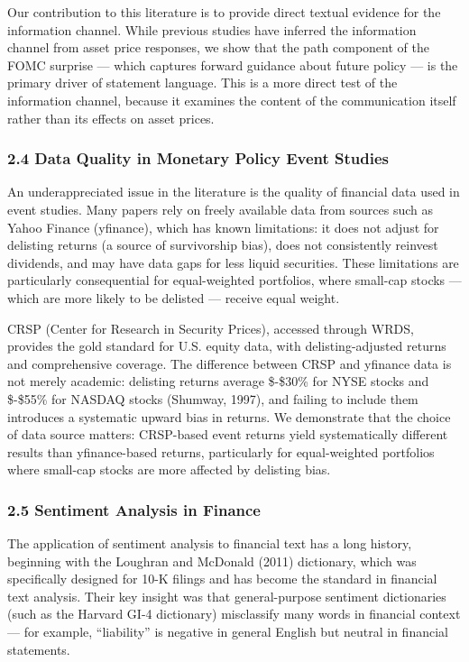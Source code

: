 \documentclass[12pt]{article}
\begin{document}
Our contribution to this literature is to provide direct textual
evidence for the information channel. While previous studies have
inferred the information channel from asset price responses, we show
that the path component of the FOMC surprise --- which captures forward
guidance about future policy --- is the primary driver of statement
language. This is a more direct test of the information channel, because
it examines the content of the communication itself rather than its
effects on asset prices.

\subsubsection{2.4 Data Quality in Monetary Policy Event
Studies}\label{data-quality-in-monetary-policy-event-studies}

An underappreciated issue in the literature is the quality of financial
data used in event studies. Many papers rely on freely available data
from sources such as Yahoo Finance (yfinance), which has known
limitations: it does not adjust for delisting returns (a source of
survivorship bias), does not consistently reinvest dividends, and may
have data gaps for less liquid securities. These limitations are
particularly consequential for equal-weighted portfolios, where
small-cap stocks --- which are more likely to be delisted --- receive
equal weight.

CRSP (Center for Research in Security Prices), accessed through WRDS,
provides the gold standard for U.S. equity data, with delisting-adjusted
returns and comprehensive coverage. The difference between CRSP and
yfinance data is not merely academic: delisting returns average
\$-\$30\% for NYSE stocks and \$-\$55\% for NASDAQ stocks (Shumway,
1997), and failing to include them introduces a systematic upward bias
in returns. We demonstrate that the choice of data source matters:
CRSP-based event returns yield systematically different results than
yfinance-based returns, particularly for equal-weighted portfolios where
small-cap stocks are more affected by delisting bias.

\subsubsection{2.5 Sentiment Analysis in
Finance}\label{sentiment-analysis-in-finance}

The application of sentiment analysis to financial text has a long
history, beginning with the Loughran and McDonald (2011) dictionary,
which was specifically designed for 10-K filings and has become the
standard in financial text analysis. Their key insight was that
general-purpose sentiment dictionaries (such as the Harvard GI-4
dictionary) misclassify many words in financial context --- for example,
``liability'' is negative in general English but neutral in financial
statements.
\end{document}
